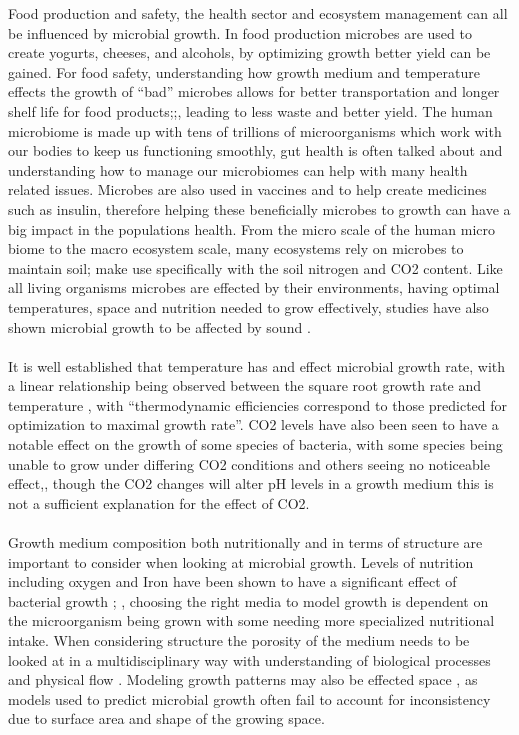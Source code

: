 \documentclass{article}
\begin{document}
	Food production and safety, the health sector and ecosystem management can all be influenced by microbial growth. In food production microbes are used to create yogurts, cheeses, and alcohols, by optimizing growth better yield can be gained. For food safety, understanding how growth medium and temperature effects the growth of “bad” microbes allows for better transportation and longer shelf life for food  products\autocite{Koutsoumanis2000ApplicationPredictions};\autocite{Ross2003ModelingAssessments};\autocite{Bruckner2012InfluencePoultry}, leading to less waste and better yield. The human microbiome is made up with tens of trillions of microorganisms which work with our bodies to keep us functioning smoothly, gut health is often talked about and understanding how to manage our microbiomes can help with many health related issues. Microbes are also used in vaccines and to help create medicines such as insulin, therefore helping these beneficially microbes to growth can have a big impact in the populations health. From the micro scale of the human micro biome to the macro ecosystem scale, many ecosystems rely on microbes to maintain soil\autocite{Davis2005EffectsBacteria}; \autocite{Lipson2015TheProcesses} make use specifically with the soil nitrogen and CO2 content. Like all living organisms microbes are effected by their environments, having optimal temperatures, space and nutrition needed to grow effectively, studies have also shown microbial growth to be affected by sound \autocite{Sarvaiya2015EffectMetabolites}.
	\\
	\\
	It is well established that temperature has and effect microbial growth rate, with a linear relationship being observed between the square root growth rate and temperature \autocite{Ratkowsky1982RelationshipCultures}, with “thermodynamic efficiencies correspond to those predicted for optimization to maximal growth rate”\autocite{Westerhoff1983ThermodynamicWastage}. CO2 levels have also been seen to have a notable effect on the growth of some species of bacteria, with some species being unable to grow under differing CO2 conditions and others seeing no noticeable effect,\autocite{CoyneTheGrowth}, though the CO2 changes will alter pH levels in a growth medium this is not a sufficient explanation for the effect of CO2.
	\\
	\\
	Growth medium composition both nutritionally and in terms of structure are important to consider when looking at microbial growth. Levels of nutrition including oxygen and Iron have been shown to have a significant effect of bacterial growth \autocite{Yang2001EffectsAMB-1}; \autocite{Davis2005EffectsBacteria}, choosing the right media to model growth is dependent on the microorganism being grown with some needing more specialized nutritional intake. When considering structure the porosity of the medium needs to be looked at in a multidisciplinary way with understanding of biological processes and physical  flow \autocite{Murphy2000ModelingMedia}. Modeling growth patterns may also be effected space \autocite{Dens2000OnProducts}, as models used to predict microbial growth often fail to account for inconsistency due to surface area and shape of the growing space.
\end{document}
